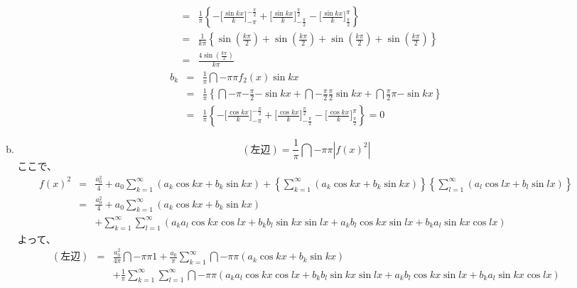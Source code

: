 \documentclass[dvipdfmx,titlepage, 11pt, a4paper]{jsarticle}%
\begin{document}
\begin{enumerate}[(1)]
\begin{enumerate}[(a)]
\begin{eqnarray*}
      &=& \frac{1}{\pi}\left\{-\biggl[\frac{\sin kx}{k}\biggr]_{-\pi}^{-\frac{\pi}{2}} + \biggl[\frac{\sin kx}{k}\biggr]_{-\frac{\pi}{2}}^{\frac{\pi}{2}}
      - \biggl[\frac{\sin kx}{k}\biggr]_{\frac{\pi}{2}}^{\pi}\right\}\\
      &=& \frac{1}{k\pi}\left\{\sin \left(\frac{k\pi}{2}\right) + \sin\left(\frac{k\pi}{2}\right) + \sin\left(\frac{k\pi}{2}\right) + \sin\left(\frac{k\pi}{2}\right)\right\}\\
      &=& \frac{4\sin\left(\frac{k\pi}{2}\right)}{k\pi}
    \end{eqnarray*}
    \begin{eqnarray*}
      b_k &=&\frac{1}{\pi}\dint{-\pi}{\pi}{f_2(x)\sin kx}\\
      &=& \frac{1}{\pi}\left\{\dint{-\pi}{-\frac{\pi}{2}}{-\sin kx} + \dint{-\frac{\pi}{2}}{\frac{\pi}{2}}{\sin kx} + 
      \dint{\frac{\pi}{2}}{\pi}{-\sin kx}\right\}\\
      &=& \frac{1}{\pi}\left\{-\biggl[\frac{\cos kx}{k}\biggr]_{-\pi}^{-\frac{\pi}{2}} + \biggl[\frac{\cos kx}{k}\biggr]_{-\frac{\pi}{2}}^{\frac{\pi}{2}}
      - \biggl[\frac{\cos kx}{k}\biggr]_{\frac{\pi}{2}}^{\pi}\right\} = 0
    \end{eqnarray*}
    \item \begin{equation*}
      (左辺) = \frac{1}{\pi}\dint{-\pi}{\pi}{|f(x)^2|}
    \end{equation*}
    ここで、
    \begin{eqnarray*}
      f(x)^2 &=& \frac{a_0^2}{4} + a_0\sum_{k = 1}^{\infty}(a_k\cos kx + b_k\sin kx) 
      + \left\{\sum_{k = 1}^{\infty}(a_k\cos kx + b_k\sin kx)\right\}\left\{\sum_{l = 1}^{\infty}(a_l\cos lx + b_l\sin lx)\right\}\\
      &=& \frac{a_0^2}{4} + a_0\sum_{k = 1}^{\infty}(a_k\cos kx + b_k\sin kx)\\
      &&+ \sum_{k = 1}^{\infty}\sum_{l = 1}^{\infty}(a_ka_l\cos kx\cos lx + b_kb_l\sin kx\sin lx + a_kb_l\cos kx\sin lx + b_ka_l\sin kx\cos lx)
    \end{eqnarray*}
    よって、
    \begin{eqnarray*}
      (左辺) &=& \frac{a_0^2}{4\pi}\dint{-\pi}{\pi}{1} + \frac{a_0}{\pi}\sum_{k = 1}^{\infty}\dint{-\pi}{\pi}{(a_k\cos kx + b_k\sin kx)}\\
      && + \frac{1}{\pi}\sum_{k = 1}^{\infty}\sum_{l = 1}^{\infty}\dint{-\pi}{\pi}{(a_ka_l\cos kx\cos lx + b_kb_l\sin kx\sin lx + a_kb_l\cos kx\sin lx + b_ka_l\sin kx\cos lx)}\\

\end{eqnarray*}
\end{enumerate}
\end{enumerate}
\end{document}
